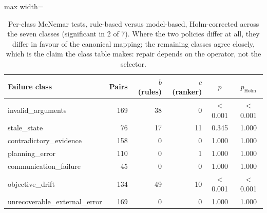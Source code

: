 \begin{table}[!ht]
\centering\scriptsize
\setlength{\tabcolsep}{4pt}
\caption{Per-class McNemar tests, rule-based versus model-based, Holm-corrected across the seven classes (significant in 2 of 7). Where the two policies differ at all, they differ in favour of the canonical mapping; the remaining classes agree closely, which is the claim the class table makes: repair depends on the operator, not the selector.}
\label{tab:appendix_tests_class}
\begin{adjustbox}{max width=\textwidth}
\begin{tabular}{@{}lrrrcc@{}}
\toprule
Failure class & Pairs & $b$ (rules) & $c$ (ranker) & $p$ & $p_{\text{Holm}}$ \\
\midrule
invalid\_arguments & 169 & 38 & 0 & \ensuremath{<}0.001 & \ensuremath{<}0.001 \\
stale\_state & 76 & 17 & 11 & 0.345 & 1.000 \\
contradictory\_evidence & 158 & 0 & 0 & 1.000 & 1.000 \\
planning\_error & 110 & 0 & 1 & 1.000 & 1.000 \\
communication\_failure & 45 & 0 & 0 & 1.000 & 1.000 \\
objective\_drift & 134 & 49 & 10 & \ensuremath{<}0.001 & \ensuremath{<}0.001 \\
unrecoverable\_external\_error & 169 & 0 & 0 & 1.000 & 1.000 \\
\bottomrule
\end{tabular}
\end{adjustbox}
\end{table}
